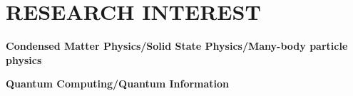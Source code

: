 \documentclass[letterpaper,11pt]{article}
\newcommand{\resumeItem}[1]{
	\item\small{
		{#1 \vspace{-2pt}}
	}
}
\newcommand{\resumeItemListStart}{\begin{itemize}}
\newcommand{\resumeItemListEnd}{\end{itemize}\vspace{-5pt}}
\begin{document}
	\section{RESEARCH INTEREST}
	
	\textbf{Condensed Matter Physics/Solid State Physics/Many-body particle physics}

	\vspace{7pt}
	
	\textbf{Quantum Computing/Quantum Information}
	
	

	
	
	
	

    
 
\end{document}
